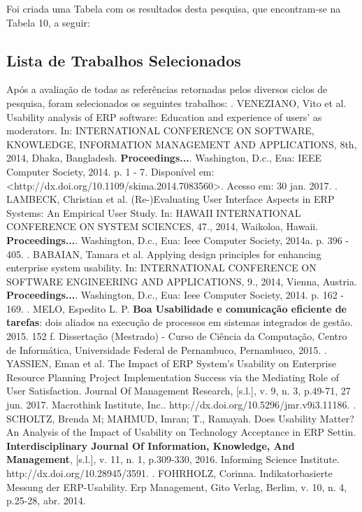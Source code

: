 Foi criada uma Tabela com os resultados desta pesquisa, que encontram-se na Tabela 10, a seguir:



\subsection{Lista de Trabalhos Selecionados}

Após a avaliação de todas as referências retornadas pelos diversos ciclos de pesquisa, foram selecionados os seguintes trabalhos:\newline
{}. VENEZIANO, Vito et al. Usability analysis of ERP software: Education and experience of users' as moderators. In: INTERNATIONAL CONFERENCE ON SOFTWARE, KNOWLEDGE, INFORMATION MANAGEMENT AND APPLICATIONS, 8th, 2014, Dhaka, Bangladesh. \textbf{Proceedings...}. Washington, D.c., Eua: IEEE Computer Society, 2014. p. 1 - 7. Disponível em: <http://dx.doi.org/10.1109/skima.2014.7083560>. Acesso em: 30 jan. 2017.\newline
{}. LAMBECK, Christian et al. (Re-)Evaluating User Interface Aspects in ERP Systems: An Empirical User Study. In: HAWAII INTERNATIONAL CONFERENCE ON SYSTEM SCIENCES, 47., 2014, Waikoloa, Hawaii. \textbf{Proceedings...}. Washington, D.c., Eua: Ieee Computer Society, 2014a. p. 396 - 405.\newline
{}. BABAIAN, Tamara et al. Applying design principles for enhancing enterprise system usability. In: INTERNATIONAL CONFERENCE ON SOFTWARE ENGINEERING AND APPLICATIONS, 9., 2014, Vienna, Austria. \textbf{Proceedings...}. Washington, D.c., Eua: Ieee Computer Society, 2014. p. 162 - 169.\newline
{}. MELO, Espedito L. P. \textbf{Boa Usabilidade e comunicação eficiente de tarefas}: dois aliados na execução de processos em sistemas integrados de gestão. 2015. 152 f. Dissertação (Mestrado) - Curso de Ciência da Computação, Centro de Informática, Universidade Federal de Pernambuco, Pernambuco, 2015.\newline
{}. YASSIEN, Eman et al. The Impact of ERP System's Usability on Enterprise Resource Planning Project Implementation Success via the Mediating Role of User Satisfaction. Journal Of Management Research, [s.l.], v. 9, n. 3, p.49-71, 27 jun. 2017. Macrothink Institute, Inc.. http://dx.doi.org/10.5296/jmr.v9i3.11186.\newline
{}. SCHOLTZ, Brenda M; MAHMUD, Imran; T., Ramayah. Does Usability Matter? An Analysis of the Impact of Usability on Technology Acceptance in ERP Settin. \textbf{Interdisciplinary Journal Of Information, Knowledge, And Management}, [s.l.], v. 11, n. 1, p.309-330, 2016. Informing Science Institute. http://dx.doi.org/10.28945/3591.\newline
{}. FOHRHOLZ, Corinna. Indikatorbasierte Messung der ERP-Usability. Erp Management, Gito Verlag, Berlim, v. 10, n. 4, p.25-28, abr. 2014.


